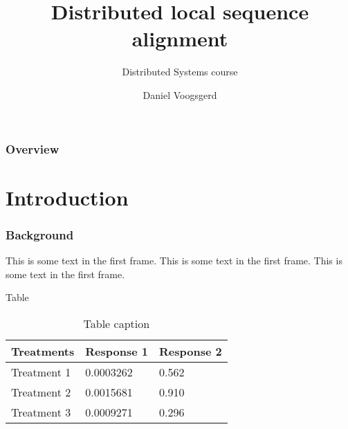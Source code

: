 \documentclass[xcolor=table]{beamer}
\title[DLSA]{Distributed local sequence alignment}
\subtitle{Distributed Systems course}
\author[Voogsgerd]{Daniel Voogsgerd}
\institute[VU]{Vrije Universiteit Amsterdam}
\begin{document}
\maketitlepage

\begin{frame}
    \frametitle{Overview}
    \tableofcontents
\end{frame}

\section{Introduction}

\begin{frame}
    \frametitle{Background}
    This is some text in the first frame. This is some text in the first frame. This is some text in the first frame.
\end{frame}

\begin{frame}{Table}
    \begin{table}
        \begin{tabular}{l l l}
            \toprule
            \textbf{Treatments} & \textbf{Response 1} & \textbf{Response 2} \\
            \midrule
            Treatment 1         & 0.0003262           & 0.562               \\
            Treatment 2         & 0.0015681           & 0.910               \\
            Treatment 3         & 0.0009271           & 0.296               \\
            \bottomrule
        \end{tabular}
        \caption{Table caption}
    \end{table}
\end{frame}
\end{document}
